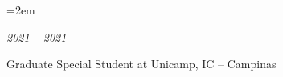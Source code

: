 \documentclass[fontsize=14pt,paper=a4]{scrartcl}
\newcommand{\MarginText}[1]{\marginpar{\raggedleft\itshape\footnotesize#1}}
\newlength{\datebox}\settowidth{\datebox}{2020---2021}
\newcommand{\NewEntry}[3]{\noindent\hangindent=2em\hangafter=0%
  \parbox{\datebox}{\small \textit{#1}}\hspace{1em} {\small #2 #3}\vspace{.5em}}
\newcommand{\Description}[1]{\hangindent=2em\hangafter=0%
  \noindent\raggedright\footnotesize{#1}\par\flushleft\normalsize}
\begin{document}
\begin{cv}

  \NewEntry{2021 -- 2021}{Graduate Special Student at Unicamp, IC -- Campinas}
  

  \vspace{1em}












\end{cv}
\end{document}
